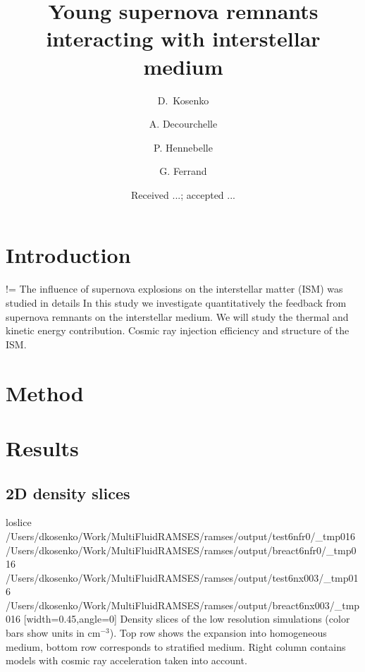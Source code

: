 \documentclass[referee,oldversion]{aa}
\def\basedir{/Users/dkosenko/Work/MultiFluidRAMSES/ramses/output}
\begin{document}
\title{Young supernova remnants interacting with interstellar medium}

\author{D.~Kosenko \and A. Decourchelle \and P. Hennebelle \and G. Ferrand}

\date{Received ...; accepted ... }


\keywords{}

%
\section{Introduction}
 \if !=
The influence of supernova explosions on the interstellar matter (ISM) was studied in details
In this study we investigate quantitatively the feedback from supernova remnants on the interstellar medium. We will study the thermal and kinetic energy contribution. Cosmic ray injection efficiency and structure of the ISM.
\fi
\section{Method}


\section{Results}
\subsection{2D density slices}

\def\thom{\basedir/test6nfr0}
\def\tstra{\basedir/test6nx003}
\def\bhom{\basedir/breact6nfr0}
\def\bstra{\basedir/breact6nx003}
\def\slice{_tmp016}
\FIGfo loslice  {\thom/\slice}  {\bhom/\slice}  {\tstra/\slice}  {\bstra/\slice} [width=0.45\hsize,angle=0]  Density slices of the low resolution simulations (color bars show units in cm$^{-3}$). Top row shows the expansion into homogeneous medium, bottom row corresponds to stratified medium. Right column contains models with cosmic ray acceleration  taken into account. 
\end{document}
